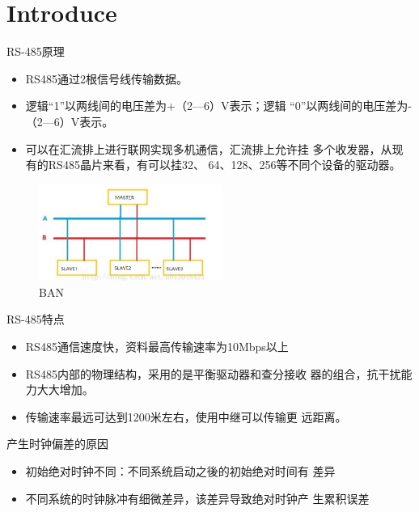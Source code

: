 \section{Introduce}

\begin{frame}[fragile]{RS-485原理}

  \begin{itemize}
    \item RS485通过2根信号线传输数据。
    \item 逻辑“1”以两线间的电压差为+（2—6）V表示；逻辑
    “0”以两线间的电压差为-（2—6）V表示。
    \item  可以在汇流排上进行联网实现多机通信，汇流排上允许挂
    多个收发器，从现有的RS485晶片来看，有可以挂32、
    64、128、256等不同个设备的驱动器。
  \end{itemize}

\begin{figure}[htbp]
\begin{center}
\includegraphics[width=6cm]{img/485net}
\caption{BAN }
\label{Overview}
\end{center}
\vspace{-0.5em}
\end{figure}


\end{frame}


\begin{frame}[fragile]{RS-485特点}

\begin{itemize}
  \item RS485通信速度快，资料最高传输速率为10Mbps以上
  \item RS485内部的物理结构，采用的是平衡驱动器和查分接收
  器的组合，抗干扰能力大大增加。
  \item  传输速率最远可达到1200米左右，使用中继可以传输更
  远距离。
\end{itemize}

\end{frame}

\begin{frame}[fragile]{产生时钟偏差的原因}

\begin{itemize}
  \item 初始绝对时钟不同：不同系统启动之後的初始绝对时间有
  差异
  \item 不同系统的时钟脉冲有细微差异，该差异导致绝对时钟产
  生累积误差
\end{itemize}

\end{frame}

